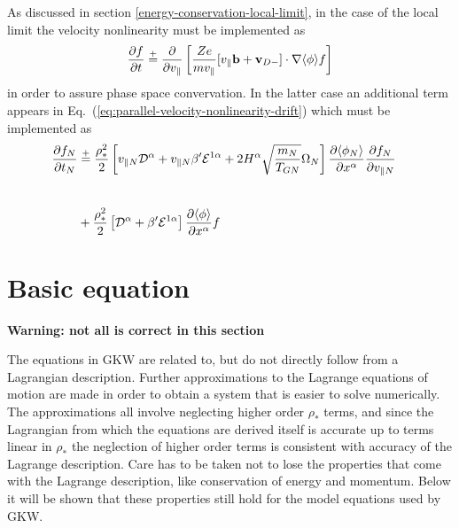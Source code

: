 As discussed in section \ref{energy-conservation-local-limit}, in the case of the local limit the velocity nonlinearity 
must be implemented as 
\begin{equation}
\frac{\partial  f}{\partial  t} \overset{+}{=} \frac{\partial }{\partial  v_\parallel} \left [ \frac{Ze }{ m v_\parallel} 
[ v_\parallel {\bf b} + {\bf v}_{D-} ] \cdot \nabla \langle \phi \rangle  f \right ]  
\end{equation}
in order to assure phase space convervation. In the latter case an additional term appears in Eq.~(\ref{eq:parallel-velocity-nonlinearity-drift})
which must be implemented as 
\begin{align}
\pd{ f_N}{ t_N} &\overset{+}{=}
\frac{\rho_*^2 }{ 2} \left [ v_{\parallel N} {\cal D}^\alpha + v_{\parallel N} \beta^\prime {\cal E}^{1 \alpha} + 
2 H^\alpha \sqrt{\frac{m_N}{T_{GN}}} \Omega_N \right ] 
\pd{ \langle \phi_N \rangle}{ x^\alpha} \pd{ f_N }{v_{\parallel N}} \cr 
\noalign{\vskip 0.2 truecm} \\
& + \frac{\rho_*^2 }{ 2} \left [ {\cal D}^\alpha + \beta^\prime {\cal E}^{1 \alpha} \right ] \pd{ \langle \phi \rangle }{x^\alpha} f 
\end{align}

\section{Basic equation} 

{\bf Warning: not all is correct in this section} 

The equations in GKW are related to, but do not directly follow from a Lagrangian description. 
Further approximations to the Lagrange equations of motion are made in order to obtain a system that 
is easier to solve numerically. The approximations all involve neglecting higher order $\rho_*$ terms,
and since the Lagrangian from which the equations are derived itself is accurate up to terms linear in $\rho_*$ 
the neglection of higher order terms is consistent with accuracy of the Lagrange description. 
Care has to be taken not to lose the properties that come with the Lagrange description, like conservation 
of energy and momentum. Below it will be shown that these properties still hold for the model equations 
used by GKW. 

